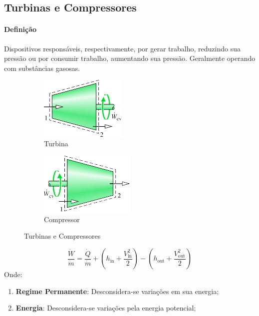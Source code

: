 \documentclass{article}
\begin{document}
        \subsection{Turbinas e Compressores}
            \paragraph{Definição}Dispositivos responsáveis, respectivamente, por gerar trabalho, reduzindo sua pressão ou por consumir trabalho, aumentando sua pressão. Geralmente operando com substâncias gasosas.
                \begin{figure}[h]
                    \begin{subfigure}[t]{0.5\textwidth}
                        \centering
                        \includegraphics[height = 3cm]{Turbina.png}
                        \caption{Turbina}
                    \end{subfigure}
                    \begin{subfigure}[t]{0.5\textwidth}
                        \centering
                        \includegraphics[height = 3cm]{Compressor de Ar.png}
                        \caption{Compressor}
                    \end{subfigure}
                    \caption{Turbinas e Compressores}
                \end{figure}
                \[\boxed{
                    \frac{\dot{W}}{\dot{m}} =
                    \frac{\dot{Q}}{\dot{m}} +
                    \left(h_{\text{in}} + \frac{V^{2}_{\text{in}}}{2}\right) -
                    \left(h_{\text{out}} + \frac{V^{2}_{\text{out}}}{2}\right)}\]
            Onde:
                \begin{enumerate}[noitemsep]
                    \item \textbf{Regime Permanente}: Desconsidera-se variações em sua energia;
                    \item \textbf{Energia}: Desconsidera-se variações pela energia potencial;
                \end{enumerate}
\newpage
\end{document}
